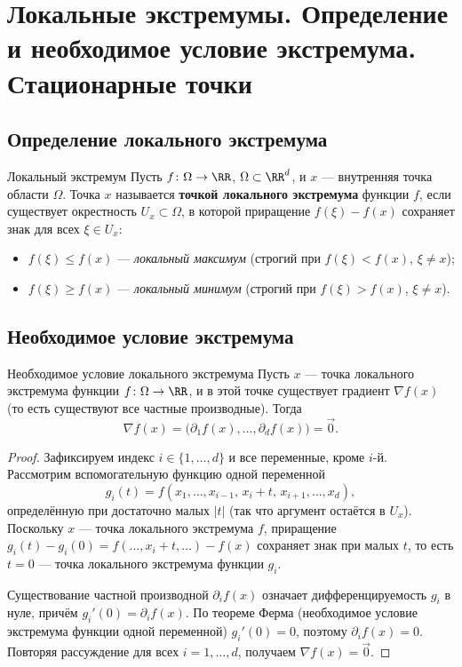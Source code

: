 
\section{Локальные экстремумы. Определение и необходимое условие экстремума. Стационарные точки}

\subsection*{Определение локального экстремума}

\begin{Definition}[required]{Локальный экстремум}{}
	Пусть $f\colon\Omega\to\RR$, $\Omega\subset\RR^d$, и $x$ --- внутренняя точка
	области $\Omega$. Точка $x$ называется \textbf{точкой локального экстремума}
	функции $f$, если существует окрестность $U_x\subset\Omega$, в которой приращение
	$f(\xi)-f(x)$ сохраняет знак для всех $\xi\in U_x$:
	\begin{itemize}
		\item $f(\xi)\le f(x)$ --- \emph{локальный максимум} (строгий при $f(\xi)<f(x)$,
		$\xi\ne x$);
		\item $f(\xi)\ge f(x)$ --- \emph{локальный минимум} (строгий при $f(\xi)>f(x)$,
		$\xi\ne x$).
	\end{itemize}
\end{Definition}

\subsection*{Необходимое условие экстремума}

\begin{Theorem}{Необходимое условие локального экстремума}{}
	Пусть $x$ --- точка локального экстремума функции $f\colon\Omega\to\RR$, и в этой
	точке существует градиент $\nabla f(x)$ (то есть существуют все частные
	производные). Тогда
	\[
	\nabla f(x)=\bigl(\partial_1 f(x),\dots,\partial_d f(x)\bigr)=\vec 0.
	\]
\end{Theorem}

\begin{proof}
	Зафиксируем индекс $i\in\{1,\dots,d\}$ и все переменные, кроме $i$-й. Рассмотрим
	вспомогательную функцию одной переменной
	\[
	g_i(t)=f(x_1,\dots,x_{i-1},\,x_i+t,\,x_{i+1},\dots,x_d),
	\]
	определённую при достаточно малых $|t|$ (так что аргумент остаётся в $U_x$).
	Поскольку $x$ --- точка локального экстремума $f$, приращение
	$g_i(t)-g_i(0)=f(\dots,x_i+t,\dots)-f(x)$ сохраняет знак при малых $t$, то есть
	$t=0$ --- точка локального экстремума функции $g_i$.

	Существование частной производной $\partial_i f(x)$ означает дифференцируемость
	$g_i$ в нуле, причём $g_i'(0)=\partial_i f(x)$. По теореме Ферма (необходимое
	условие экстремума функции одной переменной) $g_i'(0)=0$, поэтому
	$\partial_i f(x)=0$. Повторяя рассуждение для всех $i=1,\dots,d$, получаем
	$\nabla f(x)=\vec 0$.
\end{proof}

